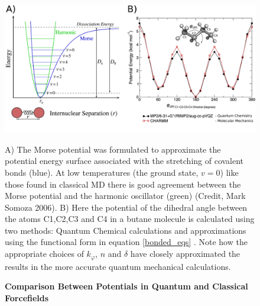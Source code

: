 \begin{figure}
	\begin{center}
	\includegraphics[width=\textwidth]{figures/QM_MM_compared.pdf}
	\end{center}
	\captionsetup{singlelinecheck = false, justification=raggedright}
	\caption[Comparison Between Potentials in Quantum and Classical Forcefields] {\textbf{Comparison Between Potentials in Quantum and Classical Forcefields}}{ A) The Morse potential was formulated to approximate the potential energy surface associated with the stretching of covalent bonds (blue). At low temperatures (the ground state, $v=0$) like those found in classical MD there is good agreement between the Morse potential and the harmonic oscillator (green) (Credit, Mark Somoza 2006). B) Here the potential of the dihedral angle between the atoms C1,C2,C3 and C4 in a butane molecule is calculated using two methods: Quantum Chemical calculations and approximations using the functional form in equation \ref{bonded_eqs} \cite{lemkul2020}. Note how the appropriate choices of $k_\varphi$, $n$ and $\delta$ have closely approximated the results in the more accurate quantum mechanical calculations.}
 
	\label{QM_MM_compared}
\end{figure}

